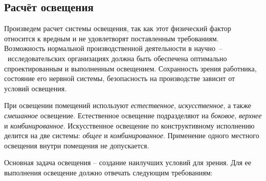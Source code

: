 \newpage
\subsection{Расчёт освещения} \label{lighting_calculation}

Произведем расчет системы освещения, так как этот физический фактор относится
к вредным и не удовлетворят поставленным требованиям. Возможность нормальной
производственной деятельности в научно~--~исследовательских организациях должна быть
обеспечена оптимально спроектированным и выполненным освещением. Сохранность зрения
работника, состояние его нервной системы, безопасность на производстве зависит от
условий освещения.

При освещении помещений используют \textit{естественное}, \textit{искусственное},
а также \textit{смешанное} освещение.
Естественное освещение подразделяют на \textit{боковое}, \textit{верхнее} и
\textit{комбинированное}.
Искусственное освещение по конструктивному исполнению делится на две системы:
\textit{общее} и \textit{комбинированное}. Применение одного местного освещения
внутри помещения не допускается.

Основная задача освещения – создание наилучших условий для зрения. Для ее
выполнения освещение должно отвечать следующим требованиям:

